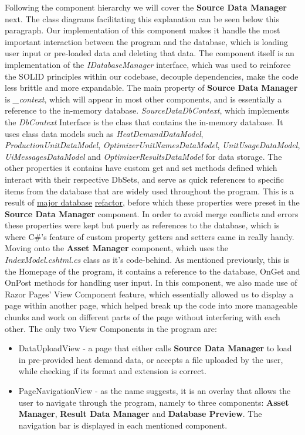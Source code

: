 \documentclass[12pt]{report}
\begin{document}
Following the component hierarchy we will cover the \textbf{Source Data Manager} next. The class diagrams facilitating this explanation
can be seen below this paragraph. Our implementation of this component makes it handle the most important interaction between the program
and the database, which is loading user input or pre-loaded data and deleting that data. The component itself is an 
implementation of the \textit{IDatabaseManager} interface, which was used to reinforce the SOLID principles within our codebase,
decouple dependencies, make the code less brittle and more expandable. The main property of \textbf{Source Data Manager} is \textit{\_context},
which will appear in most other components, and is essentially a reference to the in-memory database. \textit{SourceDataDbContext}, which
implements the \textit{DbContext} Interface is the class that contains the in-memory database. It uses class data models such as 
\textit{HeatDemandDataModel}, \textit{ProductionUnitDataModel}, \textit{OptimizerUnitNamesDataModel}, \textit{UnitUsageDataModel},
\textit{UiMessagesDataModel} and \textit{OptimizerResultsDataModel} for data storage. The other properties it contains have custom get and set methods
defined which interact with their respective DbSets, and serve as quick references to specific items from the database that are widely used throughout the program.
This is a result of \underline{major database} \underline{refactor}, before which these properties were preset in the \textbf{Source Data Manager} component.
In order to avoid merge conflicts and errors these properties were kept but puerly as references to the database, which is where
C\#'s feature of custom property getters and setters came in really handy.
Moving onto the \textbf{Asset Manager} component, which uses the \textit{IndexModel.cshtml.cs} class as it's code-behind. As mentioned
previously, this is the Homepage of the program, it contains a reference to the database, OnGet and OnPost methods for handling user
input.
In this component, we also made use of Razor Pages' View Component feature, which essentially allowed us to display a page within
another page, which helped break up the code into more manageable chunks and work on different parts of the page without interfering with each other.
The only two View Components in the program are:
\begin{itemize}
  \item DataUploadView - a page that either calls \textbf{Source Data Manager} to load in pre-provided heat demand data,
  or accepts a file uploaded by the user, while checking if its format and extension is correct.
  \item PageNavigationView - as the name suggests, it is an overlay that allows the user to navigate through the program, namely
  to three components: \textbf{Asset Manager}, \textbf{Result Data Manager} and \textbf{Database Preview}. The navigation bar is displayed
  in each mentioned component.
\end{itemize}
\end{document}
